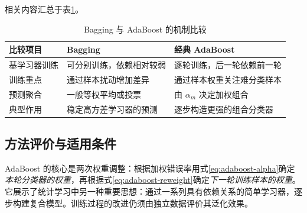 相关内容汇总于表\ref{tab:bagging-boosting}。
\begin{table}[htbp]\centering
\caption{Bagging 与 AdaBoost 的机制比较}\label{tab:bagging-boosting}
\begin{tabularx}{\textwidth}{p{29mm}XX}\toprule
比较项目&Bagging&经典 AdaBoost\\\midrule
基学习器训练&可分别训练，依赖相对较弱&逐轮训练，后一轮依赖前一轮\\
训练重点&通过样本扰动增加差异&通过样本权重关注难分类样本\\
预测聚合&一般等权平均或投票&由 $\alpha_m$ 决定加权组合\\
典型作用&稳定高方差学习器的预测&逐步构造更强的组合分类器\\\bottomrule
\end{tabularx}
\end{table}

\subsection{方法评价与适用条件}

AdaBoost 的核心是两次权重调整：根据加权错误率用式\eqref{eq:adaboost-alpha}确定\emph{本轮分类器的权重}，再根据式\eqref{eq:adaboost-reweight}确定\emph{下一轮训练样本的权重}。它展示了统计学习中另一种重要思想：通过一系列具有依赖关系的简单学习器，逐步构建复合模型。训练过程的改进仍须由独立数据评价其泛化效果。
